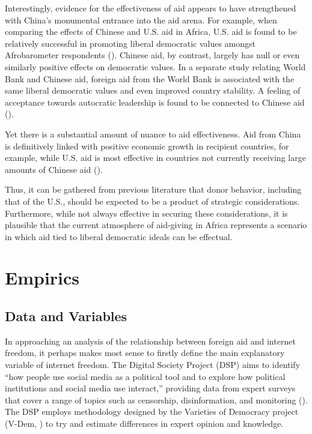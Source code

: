 \documentclass{article}
\begin{document}
Interestingly, evidence for the effectiveness of aid appears to have strengthened with China's monumental entrance into the aid arena. For example, when comparing the effects of Chinese and U.S. aid in Africa, U.S. aid is found to be relatively successful in promoting liberal democratic values amongst Afrobarometer respondents (\cite{blair2022}). Chinese aid, by contrast, largely has null or even similarly positive effects on democratic values. In a separate study relating World Bank and Chinese aid, foreign aid from the World Bank is associated with the same liberal democratic values and even improved country stability. A feeling of acceptance towards autocratic leadership is found to be connected to Chinese aid (\cite{gehring2022}).

Yet there is a substantial amount of nuance to aid effectiveness. Aid from China is definitively linked with positive economic growth in recipient countries, for example, while U.S. aid is most effective in countries not currently receiving large amounts of Chinese aid (\cite{dreher2021}).

Thus, it can be gathered from previous literature that donor behavior, including that of the U.S., should be expected to be a product of strategic considerations. Furthermore, while not always effective in securing these considerations, it is plausible that the current atmosphere of aid-giving in Africa represents a scenario in which aid tied to liberal democratic ideals can be effectual. 

\section*{Empirics}
\subsection*{Data and Variables}
In approaching an analysis of the relationship between foreign aid and internet freedom, it perhaps makes most sense to firstly define the main explanatory variable of internet freedom. The Digital Society Project (DSP) aims to identify ``how people use social media as a political tool and to explore how political institutions and social media use interact,'' providing data from expert surveys that cover a range of topics such as censorship, disinformation, and monitoring (\cite{mechkova2022}). The DSP employs methodology designed by the Varieties of Democracy project (V-Dem, \cite{coppedge2022}) to try and estimate differences in expert opinion and knowledge.
\end{document}
